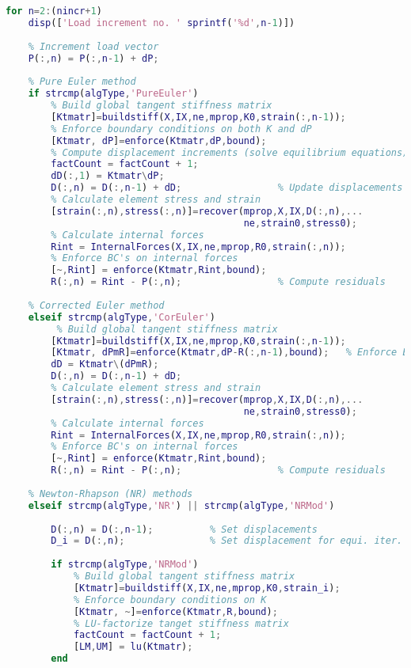 \begin{lstlisting}[language=Matlab, caption = FE implementation for material non-linearity, label=lst:CodeMNA]
% Loop through load increments
for n=2:(nincr+1)
    disp(['Load increment no. ' sprintf('%d',n-1)])
    
    % Increment load vector
    P(:,n) = P(:,n-1) + dP;                 
    
    % Pure Euler method
    if strcmp(algType,'PureEuler')
        % Build global tangent stiffness matrix
        [Ktmatr]=buildstiff(X,IX,ne,mprop,K0,strain(:,n-1));
        % Enforce boundary conditions on both K and dP
        [Ktmatr, dP]=enforce(Ktmatr,dP,bound);
        % Compute displacement increments (solve equilibrium equations)
        factCount = factCount + 1;
        dD(:,1) = Ktmatr\dP;                    
        D(:,n) = D(:,n-1) + dD;                 % Update displacements
        % Calculate element stress and strain
        [strain(:,n),stress(:,n)]=recover(mprop,X,IX,D(:,n),...
                                          ne,strain0,stress0);
        % Calculate internal forces
        Rint = InternalForces(X,IX,ne,mprop,R0,strain(:,n));
        % Enforce BC's on internal forces
        [~,Rint] = enforce(Ktmatr,Rint,bound);  
        R(:,n) = Rint - P(:,n);                 % Compute residuals
        
    % Corrected Euler method
    elseif strcmp(algType,'CorEuler')
         % Build global tangent stiffness matrix
        [Ktmatr]=buildstiff(X,IX,ne,mprop,K0,strain(:,n-1)); 
        [Ktmatr, dPmR]=enforce(Ktmatr,dP-R(:,n-1),bound);   % Enforce BC's
        dD = Ktmatr\(dPmR);
        D(:,n) = D(:,n-1) + dD;
        % Calculate element stress and strain
        [strain(:,n),stress(:,n)]=recover(mprop,X,IX,D(:,n),...
                                          ne,strain0,stress0);              
        % Calculate internal forces
        Rint = InternalForces(X,IX,ne,mprop,R0,strain(:,n));
        % Enforce BC's on internal forces
        [~,Rint] = enforce(Ktmatr,Rint,bound);  
        R(:,n) = Rint - P(:,n);                 % Compute residuals
        
    % Newton-Rhapson (NR) methods
    elseif strcmp(algType,'NR') || strcmp(algType,'NRMod')
        
        D(:,n) = D(:,n-1);          % Set displacements
        D_i = D(:,n);               % Set displacement for equi. iter.
      
        if strcmp(algType,'NRMod')
            % Build global tangent stiffness matrix
            [Ktmatr]=buildstiff(X,IX,ne,mprop,K0,strain_i);
            % Enforce boundary conditions on K
            [Ktmatr, ~]=enforce(Ktmatr,R,bound);
            % LU-factorize tanget stiffness matrix
            factCount = factCount + 1;
            [LM,UM] = lu(Ktmatr);      
        end 
            

\end{lstlisting}
